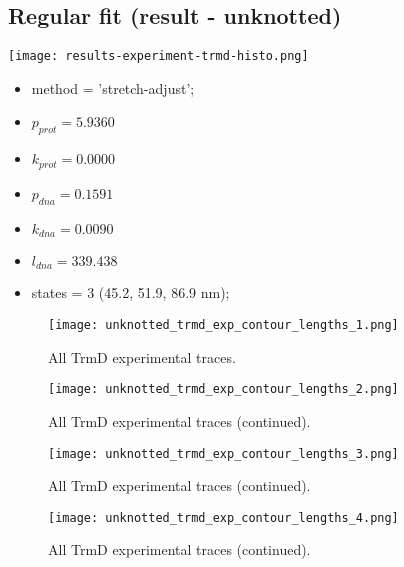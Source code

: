 \subsection{Regular fit (result - unknotted)}
\label{subsec:fit-details-trmd-experiment-unknotted}
\begin{minipage}[c]{0.7\textwidth}
    \texttt{[image: results-experiment-trmd-histo.png]}
\end{minipage}
\hfill
\begin{minipage}[c]{0.45\textwidth}
    \begin{itemize}
        \item method = 'stretch-adjust';
        \item $p_{prot}=5.9360$
        \item $k_{prot}=0.0000$
        \item $p_{dna}=0.1591$
        \item $k_{dna}=0.0090$
        \item $l_{dna}=339.438$
        \item states = 3 (45.2, 51.9, 86.9 nm);
    \end{itemize}
\end{minipage}

\begin{figure}
    \centering
    \texttt{[image: unknotted\_trmd\_exp\_contour\_lengths\_1.png]}
    \caption{All TrmD experimental traces.}
    \label{fig:unkotted-trmd-exp-cl1}
\end{figure}

\begin{figure}
    \centering
    \texttt{[image: unknotted\_trmd\_exp\_contour\_lengths\_2.png]}
    \caption{All TrmD experimental traces (continued).}
    \label{fig:unkotted-trmd-exp-cl2}
\end{figure}

\begin{figure}
    \centering
    \texttt{[image: unknotted\_trmd\_exp\_contour\_lengths\_3.png]}
    \caption{All TrmD experimental traces (continued).}
    \label{fig:unkotted-trmd-exp-cl3}
\end{figure}

\begin{figure}
    \centering
    \texttt{[image: unknotted\_trmd\_exp\_contour\_lengths\_4.png]}
    \caption{All TrmD experimental traces (continued).}
    \label{fig:unkotted-trmd-exp-cl4}
\end{figure}

